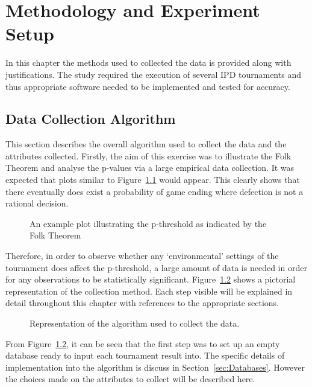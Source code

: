 \chapter{Methodology and Experiment Setup}\label{ch:Methods}
In this chapter the methods used to collected the data is provided along with
justifications. The study required the execution of several IPD tournaments and
thus appropriate software needed to be implemented and tested for accuracy.  

\section{Data Collection Algorithm}\label{sec:Data_Collection_Algorithm}
This section describes the overall algorithm used to collect the data and the
attributes collected. Firstly, the aim of this exercise was
to illustrate the Folk Theorem and analyse the p-values via a large empirical
data collection. It was expected that plots similar to Figure~\ref{fig:flk_thm_plt} would
appear. This clearly shows that there eventually does exist a probability of
game ending where defection is not a rational decision.

\begin{figure}
    \centering
    
    \caption{An example plot illustrating the p-threshold as indicated by the Folk Theorem}\label{fig:flk_thm_plt}
\end{figure}

Therefore, in order to observe whether any `environmental' settings of the
tournament does affect the p-threshold, a large amount of data is needed in
order for any observations to be statistically significant. Figure~\ref{fig:alg_diag} shows
a pictorial representation of the collection method. Each step visible will be
explained in detail throughout this chapter with references to the appropriate sections.

\begin{figure}
    \centering
    
    \caption{Representation of the algorithm used to collect the data.}\label{fig:alg_diag}
\end{figure}

From Figure~\ref{fig:alg_diag}, it can be seen that the first step was to set up an empty
database ready to input each tournament result into. 
The specific details of implementation into the algorithm is discuss in
Section~\ref{sec:Databases}. However the choices made on the attributes to
collect will be described here. 


